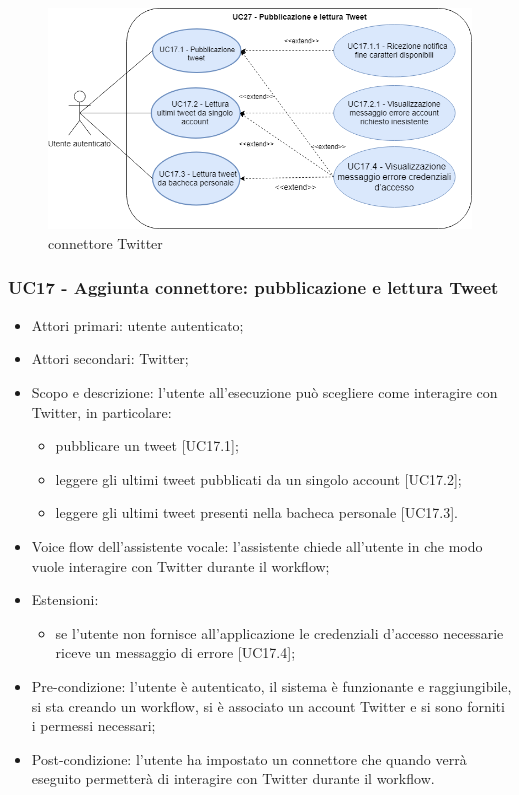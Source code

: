 \begin{figure}[H]
	\centering
	\includegraphics[width=14cm,keepaspectratio]{../includes/pics/connettore_twitter.png}
	\caption{\label{fig:mission}connettore Twitter}
\end{figure}

\subsubsection{UC17 - Aggiunta connettore: pubblicazione e lettura Tweet}
\begin{itemize}
	\item  Attori primari: utente autenticato;
    \item  Attori secondari: Twitter;
	\item  Scopo e descrizione: l'utente all'esecuzione può scegliere come interagire con Twitter, in particolare:
		   \begin{itemize}
				\item pubblicare un tweet [UC17.1];
				\item leggere gli ultimi tweet pubblicati da un singolo account [UC17.2];
				\item leggere gli ultimi tweet presenti nella bacheca personale [UC17.3].
		   \end{itemize}
	\item  Voice flow dell'assistente vocale: l'assistente chiede all'utente in che modo vuole interagire con Twitter durante il workflow;
	\item  Estensioni: 
		   \begin{itemize}
				\item se l'utente non fornisce all'applicazione le credenziali d'accesso necessarie riceve un messaggio di errore [UC17.4];
		   \end{itemize}
	\item  Pre-condizione: l'utente è autenticato, il sistema è funzionante e raggiungibile, si sta creando un workflow, si è associato un account Twitter e si sono forniti i permessi necessari;
	\item  Post-condizione: l'utente ha impostato un connettore che quando verrà eseguito permetterà di interagire con Twitter durante il workflow.
\end{itemize}
